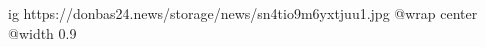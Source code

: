  
 
 
 
 

\ifcmt
  ig https://donbas24.news/storage/news/sn4tio9m6yxtjuu1.jpg
  @wrap center
  @width 0.9
\fi
